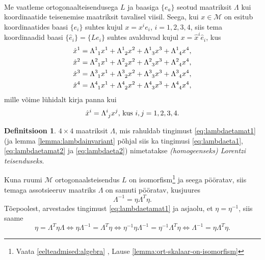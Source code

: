 \documentclass[a4paper,12pt]{article}
\theoremstyle{plain}
\theoremstyle{definition}
\newtheorem{definitsioon}{Definitsioon}[section]
\numberwithin{equation}{section}
\begin{document}
\paragraph*{}
Me vaatleme ortogonaalteisendusega $L$ ja baasiga $\{e_a\}$ seotud maatriksit $\Lambda$ kui koordinaatide teisenemise maatriksit tavalisel viisil. Seega, kui $x \in \mathcal{M}$ on esitub koordinaatides baasi $\{e_i\}$ suhtes kujul $x = x^i e_i$, $i = 1, 2, 3, 4$, siis tema koordinaadid baasi $\{\hat{e}_i\} = \{Le_i\}$ suhtes avalduvad kujul $x = \hat{x}^i \hat{e}_i$, kus
\begin{align*}
\hat{x}^1 &= \Lambda\indices{^1_1} x^1 + \Lambda\indices{^1_2} x^2 + \Lambda\indices{^1_3} x^3 + \Lambda\indices{^1_4} x^4, \\
\hat{x}^2 &= \Lambda\indices{^2_1} x^1 + \Lambda\indices{^2_2} x^2 + \Lambda\indices{^2_3} x^3 + \Lambda\indices{^2_4} x^4, \\
\hat{x}^3 &= \Lambda\indices{^3_1} x^1 + \Lambda\indices{^3_2} x^2 + \Lambda\indices{^3_3} x^3 + \Lambda\indices{^3_4} x^4, \\
\hat{x}^4 &= \Lambda\indices{^4_1} x^1 + \Lambda\indices{^4_2} x^2 + \Lambda\indices{^4_3} x^3 + 
\Lambda\indices{^4_4} x^4,
\end{align*}
mille võime lühidalt kirja panna kui
\begin{equation*}
\hat{x}^i = \Lambda\indices{^i_j} x^j \text{, kus } i,j=1, 2, 3, 4.
\end{equation*}

\begin{definitsioon}
$4 \times 4$ maatriksit $\Lambda$, mis rahuldab tingimust \ref{eq:lambdaetamat1} (ja lemma \ref{lemma:lambdainvariant} põhjal siis ka tingimusi \ref{eq:lambdaeta1}, \ref{eq:lambdaetamat2} ja \ref{eq:lambdaeta2}) nimetatakse \emph{(homogeenseks) Lorentzi teisenduseks}.
\end{definitsioon}

Kuna ruumi $\mathcal{M}$ ortogonaalsteisendus $L$ on isomorfism\footnote{{Vaata \ref{eelteadmised:algebra} , Lause \ref{lemma:ort-skalaar-on-isomorfism}}} 
ja seega pööratav, siis temaga assotsieeruv maatriks $\Lambda$ on samuti pööratav, kusjuures
\begin{equation} \label{eq:lambda-1lambda-trans}
\Lambda^{-1} = \eta \Lambda^T \eta.
\end{equation}
Tõepoolest, arvestades tingimust \ref{eq:lambdaetamat1} ja asjaolu, et $\eta = \eta^{-1}$, siis saame
\begin{equation*}
\eta = \Lambda^T \eta \Lambda \iff \eta \Lambda^{-1} = \Lambda^T \eta \iff \eta^{-1} \eta \Lambda^{-1} = \eta^{-1} \Lambda^T \eta \iff \Lambda^{-1} = \eta \Lambda^T \eta.
\end{equation*}
\end{document}
